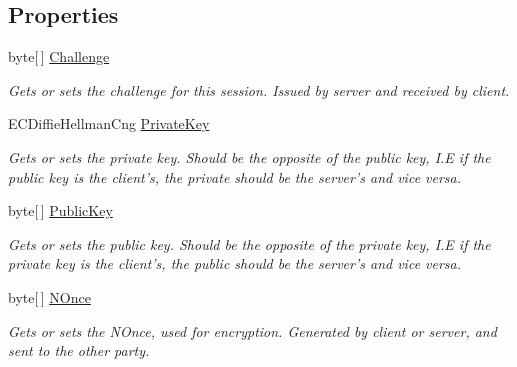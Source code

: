 \subsection*{Properties}
\begin{DoxyCompactItemize}
\item 
byte\mbox{[}$\,$\mbox{]} \hyperlink{class_gonzo_net_1_1_encryption_1_1_a_e_s_encryptor_acd5c42b066f3e2b132289d40bfcdd6f0}{Challenge}
\begin{DoxyCompactList}\small\item\em Gets or sets the challenge for this session. Issued by server and received by client. \end{DoxyCompactList}\item 
E\+C\+Diffie\+Hellman\+Cng \hyperlink{class_gonzo_net_1_1_encryption_1_1_a_e_s_encryptor_a2fffc8dd757cf315c2b0e4093b970868}{Private\+Key}
\begin{DoxyCompactList}\small\item\em Gets or sets the private key. Should be the opposite of the public key, I.\+E if the public key is the client's, the private should be the server's and vice versa. \end{DoxyCompactList}\item 
byte\mbox{[}$\,$\mbox{]} \hyperlink{class_gonzo_net_1_1_encryption_1_1_a_e_s_encryptor_acbfabbfe5f2218a86bee68d6ea2894f7}{Public\+Key}
\begin{DoxyCompactList}\small\item\em Gets or sets the public key. Should be the opposite of the private key, I.\+E if the private key is the client's, the public should be the server's and vice versa. \end{DoxyCompactList}\item 
byte\mbox{[}$\,$\mbox{]} \hyperlink{class_gonzo_net_1_1_encryption_1_1_a_e_s_encryptor_ac109cf9e6f31770e02f88724b7e55256}{N\+Once}
\begin{DoxyCompactList}\small\item\em Gets or sets the N\+Once, used for encryption. Generated by client or server, and sent to the other party. \end{DoxyCompactList}\end{DoxyCompactItemize}
